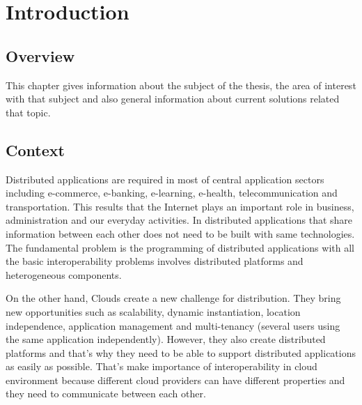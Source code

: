 
\chapter{Introduction}
\label{chapter:introduction}
\section{Overview}
\label{section:overview}
This chapter gives information about the subject of the thesis, the area of interest with that subject and also general information about current solutions related that topic.

\section{Context}
\label{section:context}

Distributed applications are required in most of central application sectors including e-commerce, e-banking, e-learning, e-health, telecommunication and transportation\citep{thesis:introduction1}. This results that the Internet plays an important role in business, administration and our everyday activities. In distributed applications that share information between each other does not need to be built with same technologies. The fundamental problem is the programming of distributed applications with all the basic interoperability problems involves distributed platforms and heterogeneous components.

On the other hand, Clouds create a new challenge for distribution. They bring new opportunities such as scalability, dynamic instantiation, location independence, application management and multi-tenancy (several users using the same application independently)\citep{thesis:introduction2}. However, they also create distributed platforms and that’s why they need to be able to support distributed applications as easily as possible. That's make importance of interoperability in cloud environment because different cloud providers can have different properties and they need to communicate between each other.

